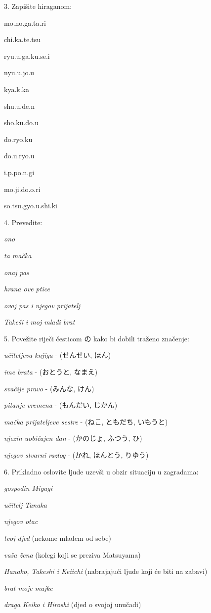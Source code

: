 	\pagebreak
	\begin{mondai}{3. Zapišite hiraganom:}
		\item mo.no.ga.ta.ri
		\item chi.ka.te.tsu
		\item ryu.u.ga.ku.se.i
		\item nyu.u.jo.u
		\item kya.k.ka
		\item shu.u.de.n
		\item sho.ku.do.u
		\item do.ryo.ku
		\item do.u.ryo.u
		\item i.p.po.n.gi
		\item mo.ji.do.o.ri
		\item so.tsu.gyo.u.shi.ki
	\end{mondai}

	\begin{mondai}{4. Prevedite:}
		\item \textit{ono}
		\item \textit{ta mačka}
		\item \textit{onaj pas}
		\item \textit{hrana ove ptice}
		\item \textit{ovaj pas i njegov prijatelj}
		\item \textit{Takeši i moj mlađi brat}
	\end{mondai}

	\begin{mondai}{5. Povežite riječi česticom の kako bi dobili traženo značenje:}
		\item \textit{učiteljeva knjiga} - (せんせい, ほん)
		\item \textit{ime brata} - (おとうと, なまえ)
		\item \textit{svačije pravo} - (みんな, けん)
		\item \textit{pitanje vremena} - (もんだい, じかん)
		\item \textit{mačka prijateljeve sestre} - (ねこ, ともだち, いもうと)
		\item \textit{njezin uobičajen dan} - (かのじょ, ふつう, ひ)
		\item \textit{njegov stvarni razlog} - (かれ, ほんとう, りゆう)
	\end{mondai}

	\begin{mondai}{6. Prikladno oslovite ljude uzevši u obzir situaciju u zagradama:}
		\item \textit{gospodin Miyagi}
		\item \textit{učitelj Tanaka}
		\item \textit{njegov otac}
		\item \textit{tvoj djed} (nekome mlađem od sebe)
		\item \textit{vaša žena} (kolegi koji se preziva Matsuyama)
		\item \textit{Hanako, Takeshi i Keiichi} (nabrajajući ljude koji će biti na zabavi)
		\item \textit{brat moje majke}
		\item \textit{draga Keiko i Hiroshi} (djed o svojoj unučadi)
	\end{mondai}


